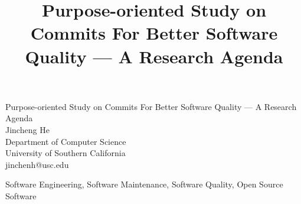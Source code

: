 \documentclass[10pt,conference]{IEEEtran}
\begin{document}
\begin{titlepage}


\title{Purpose-oriented Study on Commits For Better Software Quality --- A Research Agenda}

\author{
}

\vspace*{\fill}
\begin{center}
  {\Huge Purpose-oriented Study on Commits For Better Software Quality --- A Research Agenda}\\[5cm]
  {\Large Jincheng He}\\[0.5cm]
  {\Large Department of Computer Science}\\[0.5cm]
  {\Large University of Southern California}\\[0.5cm]
  {\Large jinchenh@usc.edu}\\[0.5cm]
  {\date{}}

\end{center}
\vspace*{\fill}
\end{titlepage}

\begin{abstract}

\end{abstract}

\begin{IEEEkeywords}
Software Engineering, Software Maintenance, Software Quality, Open Source Software
\end{IEEEkeywords}












\medskip



\vspace{12pt}
\color{red}
\end{document}
